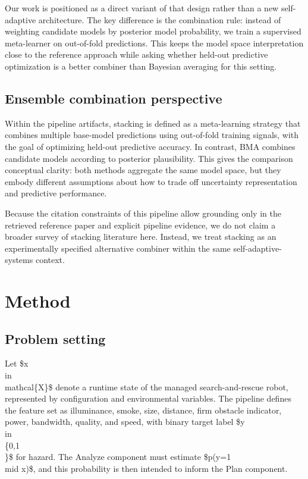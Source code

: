 \documentclass[11pt,a4paper]{article}
\begin{document}
Our work is positioned as a direct variant of that design rather than a new self-adaptive architecture. The key difference is the combination rule: instead of weighting candidate models by posterior model probability, we train a supervised meta-learner on out-of-fold predictions. This keeps the model space interpretation close to the reference approach while asking whether held-out predictive optimization is a better combiner than Bayesian averaging for this setting.


\subsection{Ensemble combination perspective}
Within the pipeline artifacts, stacking is defined as a meta-learning strategy that combines multiple base-model predictions using out-of-fold training signals, with the goal of optimizing held-out predictive accuracy. In contrast, BMA combines candidate models according to posterior plausibility. This gives the comparison conceptual clarity: both methods aggregate the same model space, but they embody different assumptions about how to trade off uncertainty representation and predictive performance.

Because the citation constraints of this pipeline allow grounding only in the retrieved reference paper and explicit pipeline evidence, we do not claim a broader survey of stacking literature here. Instead, we treat stacking as an experimentally specified alternative combiner within the same self-adaptive-systems context.


\section{Method}

\subsection{Problem setting}
Let \$x \\in \\mathcal\{X\}\$ denote a runtime state of the managed search-and-rescue robot, represented by configuration and environmental variables. The pipeline defines the feature set as illuminance, smoke, size, distance, firm obstacle indicator, power, bandwidth, quality, and speed, with binary target label \$y \\in \\\{0,1\\\}\$ for hazard. The Analyze component must estimate \$p(y=1 \\mid x)\$, and this probability is then intended to inform the Plan component.
\end{document}
